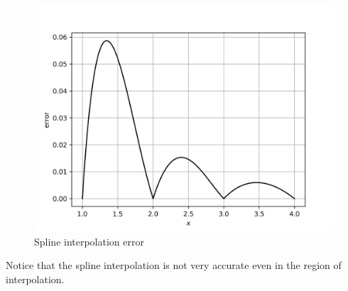 \documentclass[12,a4paper]{article}
\begin{document}
   \begin{figure}[H]
       \centering
       \includegraphics[width=\textwidth]{plots/sq1b.png}
       \caption{Spline interpolation error}
       \label{fig:sq1b}
   \end{figure}
   Notice that the spline interpolation is not very accurate even in the region of interpolation.
   \newpage
\end{document}
